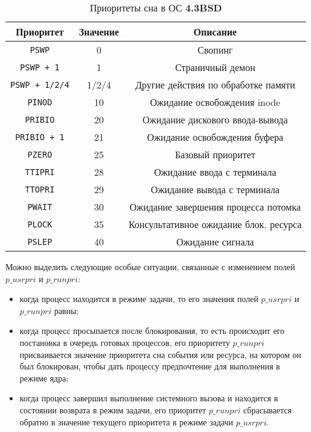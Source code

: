 \begin{table}[h]
	\begin{center}
		\begin{threeparttable}
			\caption{Приоритеты сна в ОС \textbf{4.3BSD}}
			\label{tbl:bsd}
			\begin{tabular}{|c|c|c|}
				\hline
				\textbf{Приоритет} & \textbf{Значение} & \textbf{Описание} \\
				\hline
				\texttt{PSWP} & 0 & Свопинг \\
				\hline
				\texttt{PSWP + 1} & 1 & Страничный демон \\
				\hline
				\texttt{PSWP + 1/2/4} & 1/2/4 & Другие действия по обработке памяти \\
				\hline
				\texttt{PINOD} & 10 & Ожидание освобождения inode \\
				\hline
				\texttt{PRIBIO} & 20 & Ожидание дискового ввода-вывода \\
				\hline
				\texttt{PRIBIO + 1} & 21 & Ожидание освобождения буфера \\
				\hline
				\texttt{PZERO} & 25 & Базовый приоритет \\
				\hline
				\texttt{TTIPRI} & 28 & Ожидание ввода с терминала \\
				\hline
				\texttt{TTOPRI} & 29 & Ожидание вывода с терминала \\
				\hline 
				\texttt{PWAIT} & 30 & Ожидание завершения процесса потомка \\
				\hline
				\texttt{PLOCK} & 35 & Консультативное ожидание блок. ресурса \\
				\hline
				\texttt{PSLEP} & 40 & Ожидание сигнала \\
				\hline
			\end{tabular}
		\end{threeparttable}
	\end{center}
\end{table}

\clearpage

Можно выделить следующие особые ситуации, связанные с изменением полей $p\_usrpri$ и  $p\_runpri$:

\begin{itemize}[label*=--]
	\item когда процесс находится в режиме задачи, то его значения полей $p\_usrpri$ и $p\_runpri$ равны;
	\item когда процесс просыпается после блокирования, то есть происходит его постановка в очередь готовых процессов, его приоритету $p\_runpri$ присваивается значение приоритета сна события или ресурса, на котором он был блокирован, чтобы дать процессу предпочтение для выполнения в режиме ядра;
	\item когда процесс завершил выполнение системного вызова и находится в состоянии возврата в режим задачи, его приоритет $p\_runpri$ сбрасывается обратно в значение текущего приоритета в режиме задачи $p\_usrpri$.
\end{itemize}

